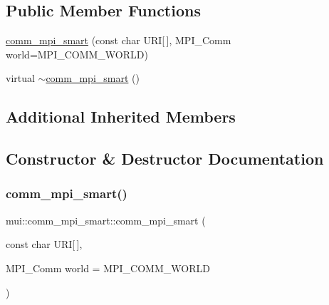 \subsection*{Public Member Functions}
\begin{DoxyCompactItemize}
\item 
\hyperlink{classmui_1_1comm__mpi__smart_a4affdf87d8bfc20fd04c6c21ad1626bf}{comm\+\_\+mpi\+\_\+smart} (const char U\+RI\mbox{[}$\,$\mbox{]}, M\+P\+I\+\_\+\+Comm world=M\+P\+I\+\_\+\+C\+O\+M\+M\+\_\+\+W\+O\+R\+LD)
\item 
virtual \hyperlink{classmui_1_1comm__mpi__smart_aff9965e2368beade94d6a33965a6316d}{$\sim$comm\+\_\+mpi\+\_\+smart} ()
\end{DoxyCompactItemize}
\subsection*{Additional Inherited Members}


\subsection{Constructor \& Destructor Documentation}
\mbox{\label{classmui_1_1comm__mpi__smart_a4affdf87d8bfc20fd04c6c21ad1626bf}} 
\subsubsection{\texorpdfstring{comm\+\_\+mpi\+\_\+smart()}{comm\_mpi\_smart()}}
{\footnotesize\ttfamily mui\+::comm\+\_\+mpi\+\_\+smart\+::comm\+\_\+mpi\+\_\+smart (\begin{DoxyParamCaption}\item[{const char}]{U\+RI\mbox{[}$\,$\mbox{]},  }\item[{M\+P\+I\+\_\+\+Comm}]{world = {\ttfamily MPI\+\_\+COMM\+\_\+WORLD} }\end{DoxyParamCaption})\hspace{0.3cm}{\ttfamily [inline]}}

\mbox{\label{classmui_1_1comm__mpi__smart_aff9965e2368beade94d6a33965a6316d}} 
